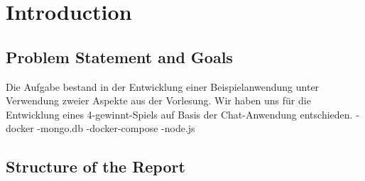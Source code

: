 
\chapter{Introduction}\label{cha:Introduction}

\section{Problem Statement and Goals}\label{sec:Aufgabenstellung}
Die Aufgabe bestand in der Entwicklung einer Beispielanwendung unter Verwendung zweier Aspekte aus der Vorlesung. Wir haben uns für die Entwicklung eines 4-gewinnt-Spiels auf Basis der Chat-Anwendung entschieden.
-docker
-mongo.db
-docker-compose
-node.js
\section{Structure of the Report}\label{sec:Structure}
